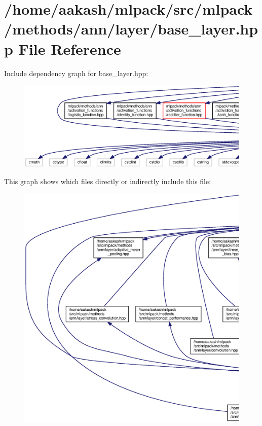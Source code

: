 \section{/home/aakash/mlpack/src/mlpack/methods/ann/layer/base\+\_\+layer.hpp File Reference}
\label{base__layer_8hpp}
Include dependency graph for base\+\_\+layer.\+hpp\+:
\nopagebreak
\begin{figure}[H]
\begin{center}
\leavevmode
\includegraphics[width=350pt]{base__layer_8hpp__incl}
\end{center}
\end{figure}
This graph shows which files directly or indirectly include this file\+:
\nopagebreak
\begin{figure}[H]
\begin{center}
\leavevmode
\includegraphics[width=350pt]{base__layer_8hpp__dep__incl}
\end{center}
\end{figure}
